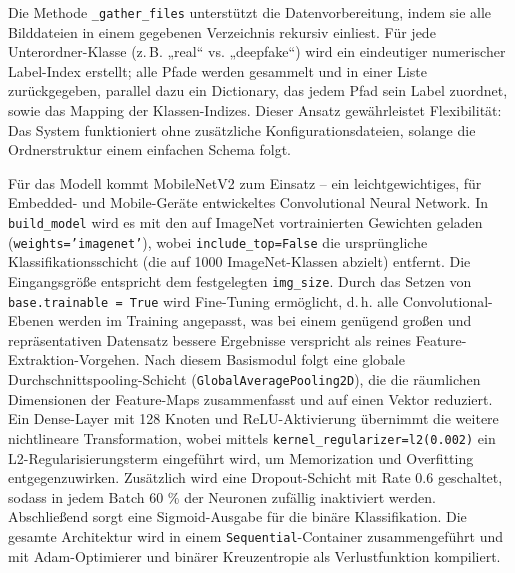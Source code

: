 Die Methode \texttt{\_gather\_files} unterstützt die Datenvorbereitung, indem sie alle Bilddateien in einem gegebenen Verzeichnis rekursiv einliest. Für jede Unterordner-Klasse (z.\,B. „real“ vs. „deepfake“) wird ein eindeutiger numerischer Label-Index erstellt; alle Pfade werden gesammelt und in einer Liste zurückgegeben, parallel dazu ein Dictionary, das jedem Pfad sein Label zuordnet, sowie das Mapping der Klassen-Indizes. Dieser Ansatz gewährleistet Flexibilität: Das System funktioniert ohne zusätzliche Konfigurationsdateien, solange die Ordnerstruktur einem einfachen Schema folgt.

Für das Modell kommt MobileNetV2 zum Einsatz – ein leichtgewichtiges, für Embedded- und Mobile-Geräte entwickeltes Convolutional Neural Network. In \texttt{build\_model} wird es mit den auf ImageNet vortrainierten Gewichten geladen (\texttt{weights='imagenet'}), wobei \texttt{include\_top=False} die ursprüngliche Klassifikationsschicht (die auf 1000 ImageNet-Klassen abzielt) entfernt. Die Eingangsgröße entspricht dem festgelegten \texttt{img\_size}. Durch das Setzen von \texttt{base.trainable = True} wird Fine-Tuning ermöglicht, d.\,h. alle Convolutional-Ebenen werden im Training angepasst, was bei einem genügend großen und repräsentativen Datensatz bessere Ergebnisse verspricht als reines Feature-Extraktion-Vorgehen. Nach diesem Basismodul folgt eine globale Durchschnittspooling-Schicht (\texttt{GlobalAveragePooling2D}), die die räumlichen Dimensionen der Feature-Maps zusammenfasst und auf einen Vektor reduziert. Ein Dense-Layer mit 128 Knoten und ReLU-Aktivierung übernimmt die weitere nichtlineare Transformation, wobei mittels \texttt{kernel\_regularizer=l2(0.002)} ein L2-Regularisierungsterm eingeführt wird, um Memorization und Overfitting entgegenzuwirken. Zusätzlich wird eine Dropout-Schicht mit Rate 0.6 geschaltet, sodass in jedem Batch 60 \% der Neuronen zufällig inaktiviert werden. Abschließend sorgt eine Sigmoid-Ausgabe für die binäre Klassifikation. Die gesamte Architektur wird in einem \texttt{Sequential}-Container zusammengeführt und mit Adam-Optimierer und binärer Kreuzentropie als Verlustfunktion kompiliert.

